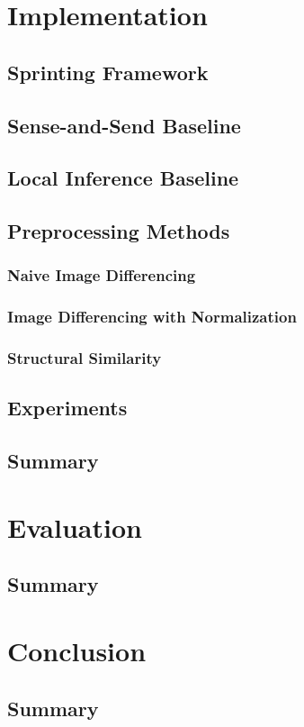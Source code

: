 \documentclass[twoside]{report}
\begin{document}
\chapter{Implementation}

\section{Sprinting Framework}

\section{Sense-and-Send Baseline}

\section{Local Inference Baseline}

\section{Preprocessing Methods}
\subsection{Naive Image Differencing}
\subsection{Image Differencing with Normalization}
\subsection{Structural Similarity}

\section{Experiments}

\section{Summary}

\chapter{Evaluation}
\section{Summary}

\chapter{Conclusion}
\section{Summary}



\end{document}
